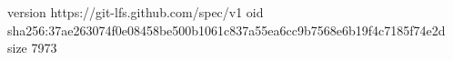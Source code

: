 version https://git-lfs.github.com/spec/v1
oid sha256:37ae263074f0e08458be500b1061c837a55ea6cc9b7568e6b19f4c7185f74e2d
size 7973
